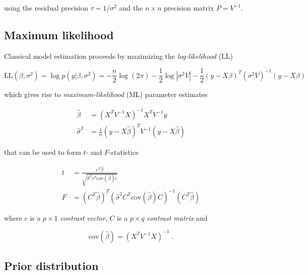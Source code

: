 using the residual precision $\tau = 1/\sigma^2$ and the $n \times n$ precision matrix $P = V^{-1}$.


\subsection{Maximum likelihood} \label{sec:GLM-MLE}

Classical model estimation proceeds by maximizing the \textit{log-likelihood} (LL)

\begin{equation} \label{eq:GLM-LL}
\mathrm{LL}(\beta,\sigma^2) = \log p(y|\beta,\sigma^2) = - \frac{n}{2} \log(2\pi) - \frac{1}{2} \log \left| \sigma^2 V \right| - \frac{1}{2} (y - X\beta)^T (\sigma^2 V)^{-1} (y - X\beta)
\end{equation}

which gives rise to \textit{maximum-likelihood} (ML) parameter estimates

\vspace{-0.5em}
\begin{equation} \label{eq:GLM-MLE}
\begin{split}
\hat{\beta} &= (X^T V^{-1} X)^{-1} X^T V^{-1} y \\
\hat{\sigma}^2 &= \frac{1}{n} (y - X\hat{\beta})^T V^{-1} (y - X\hat{\beta})
\end{split}
\end{equation}

that can be used to form $t$- and $F$-statistics

\vspace{-0.5em}
\begin{equation} \label{eq:GLM-tF}
\begin{split}
t &= \frac{c^T \hat{\beta}}{\sqrt{\hat{\sigma}^2 c^T \mathrm{cov}(\hat{\beta}) c}} \\
F &= (C^T \hat{\beta})^T (\hat{\sigma}^2 C^T \mathrm{cov}(\hat{\beta}) C)^{-1} (C^T \hat{\beta})
\end{split}
\end{equation}

where $c$ is a $p \times 1$ \textit{contrast vector}, $C$ is a $p \times q$ \textit{contrast matrix} and

\begin{equation} \label{eq:GLM-cov-beta-est}
\mathrm{cov}(\hat{\beta}) = (X^T V^{-1} X)^{-1} \; .
\end{equation}


\subsection{Prior distribution} \label{sec:GLM-NG-prior}

